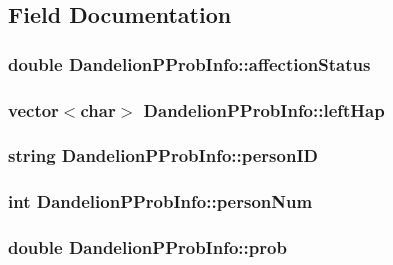 \subsection{Field Documentation}
\hypertarget{structDandelionPProbInfo_aa0be0c72636bfa42d72322b0f16bd3a0}{
\subsubsection[{affectionStatus}]{\setlength{\rightskip}{0pt plus 5cm}double {\bf DandelionPProbInfo::affectionStatus}}}
\label{structDandelionPProbInfo_aa0be0c72636bfa42d72322b0f16bd3a0}
\hypertarget{structDandelionPProbInfo_a7613ee43c9ecc04d4443e4df209b9577}{
\subsubsection[{leftHap}]{\setlength{\rightskip}{0pt plus 5cm}vector$<$char$>$ {\bf DandelionPProbInfo::leftHap}}}
\label{structDandelionPProbInfo_a7613ee43c9ecc04d4443e4df209b9577}
\hypertarget{structDandelionPProbInfo_a19a65f30f8d4ee9272191119b35724f5}{
\subsubsection[{personID}]{\setlength{\rightskip}{0pt plus 5cm}string {\bf DandelionPProbInfo::personID}}}
\label{structDandelionPProbInfo_a19a65f30f8d4ee9272191119b35724f5}
\hypertarget{structDandelionPProbInfo_a4acbb51690c01dfaa81827a2ef8ae5ad}{
\subsubsection[{personNum}]{\setlength{\rightskip}{0pt plus 5cm}int {\bf DandelionPProbInfo::personNum}}}
\label{structDandelionPProbInfo_a4acbb51690c01dfaa81827a2ef8ae5ad}
\hypertarget{structDandelionPProbInfo_ac4034ca65eee810a5f0267baa47f1420}{
\subsubsection[{prob}]{\setlength{\rightskip}{0pt plus 5cm}double {\bf DandelionPProbInfo::prob}}}

